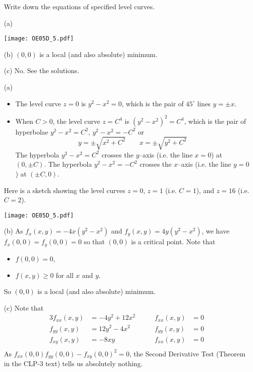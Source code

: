 \begin{hint}
Write down the equations of specified level curves.
\end{hint}

\begin{answer}
(a)
\begin{center}
     \texttt{[image: OE05D\_5.pdf]}
\end{center}

(b) $(0,0)$ is a local (and also absolute) minimum.

(c) No. See the solutions.
\end{answer}

\begin{solution}
(a) 
\begin{itemize}
\item 
The level curve $z=0$ is $y^2-x^2=0$, which is the pair
of $45^\circ$ lines $y=\pm x$. 
\item
When $C>0$, the level curve  
$z=C^4$ is ${(y^2-x^2)}^2=C^4$, which is the pair of hyperbolae 
$y^2-x^2=C^2$, $y^2-x^2=-C^2$ or 
\begin{equation*}
y=\pm\sqrt{x^2+C^2}\qquad x=\pm\sqrt{y^2+C^2}
\end{equation*}
The hyperbola  $y^2-x^2=C^2$ crosses the $y$--axis (i.e. the line $x=0$) 
at $(0,\pm C)$.
The hyperbola  $y^2-x^2=-C^2$ crosses the $x$--axis (i.e. the line $y=0$) 
at $(\pm C,0)$.
\end{itemize}
Here is a sketch showing the level curves $z=0$, $z=1$ (i.e. $C=1$),
and $z=16$ (i.e. $C=2$).

\begin{center}
     \texttt{[image: OE05D\_5.pdf]}
\end{center}

(b)
As $f_x(x,y)=-4x(y^2-x^2)$ and $f_y(x,y)=4y(y^2-x^2)$, we have 
$f_x(0,0) = f_y(0,0) = 0$ so that $(0,0)$ is a critical point. Note that 
\begin{itemize}
\item
$f(0,0)=0$, 
\item
$f(x,y)\ge 0$ for all $x$ and $y$.
\end{itemize}
So $(0,0)$ is a local (and also absolute) minimum.

(c) 
Note that
\begin{alignat*}{3}
f_{xx}(x,y) &=-4y^2+12x^2\qquad&
         f_{xx}(x,y)&=0 \\
f_{yy}(x,y) &= 12y^2-4x^2\qquad&
         f_{yy}(x,y)&=0 \\
f_{xy}(x,y) &=-8xy\qquad&
         f_{xx}(x,y)&=0 \\
\end{alignat*}
As 
$
f_{xx}(0,0)f_{yy}(0,0)-f_{xy}(0,0)^2=0
$,
the Second Derivative Test (Theorem  
in the CLP-3 text) tells us absolutely nothing.
\end{solution}

